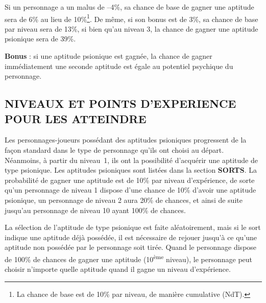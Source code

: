 \documentclass[11pt]{article}
\begin{document}
{Si un personnage a un malus de --4\%, sa chance de base de gagner une aptitude sera de 6\% au lieu de 10\%\footnote{La chance de base est de 10\% par niveau, de manière cumulative (NdT).}. De même, si son bonus est de 3\%, sa chance de base par niveau sera de 13\%, si bien qu'au niveau 3, la chance de gagner une aptitude psionique sera de 39\%.

\bigskip

\textbf{Bonus} : si une aptitude psionique est gagnée, la chance de gagner immédiatement une seconde aptitude est égale au potentiel psychique du personnage.

\subsection*{\normalsize NIVEAUX ET POINTS D'EXPERIENCE POUR LES ATTEINDRE}

Les personnages-joueurs possédant des aptitudes psioniques progressent de la façon standard dans le type de personnage qu'ils ont choisi au départ. Néanmoins, à partir du niveau~1, ils ont la possibilité d'acquérir une aptitude de type psionique. Les aptitudes psioniques sont listées dans la section \textbf{SORTS}. La probabilité de gagner une aptitude est de 10\% par niveau d'expérience, de sorte qu'un personnage de niveau 1 dispose d'une chance de 10\% d'avoir une aptitude psionique, un personnage de niveau 2 aura 20\% de chances, et ainsi de suite jusqu'au personnage de niveau 10 ayant 100\% de chances.

\bigskip

La sélection de l'aptitude de type psionique est faite aléatoirement, mais si le sort indique une aptitude déjà possédée, il est nécessaire de rejouer  jusqu'à ce qu'une aptitude non possédée par le personnage soit tirée. Quand le personnage dispose de 100\% de chances de gagner une aptitude (10\textsuperscript{ème} niveau), le personnage peut choisir n'importe quelle aptitude quand il gagne un niveau d'expérience.

}
\end{document}
